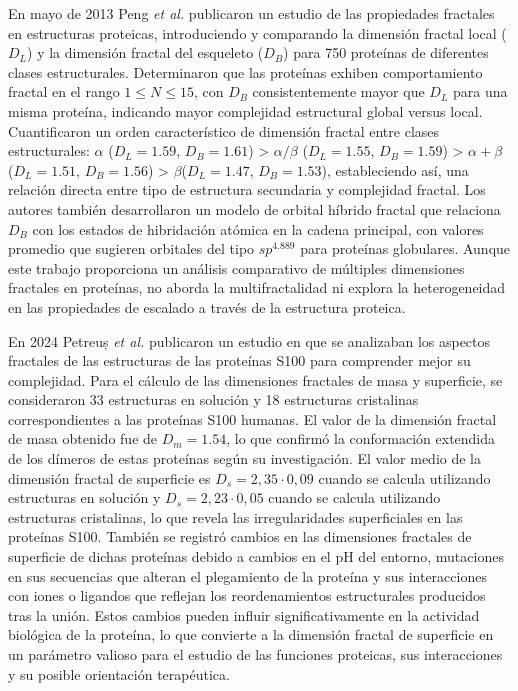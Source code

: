 En mayo de 2013 Peng \textit{et al.}\cite{Peng2013} publicaron un estudio de las propiedades fractales en estructuras proteicas, introduciendo y comparando la dimensión fractal local ($D_L$) y la dimensión fractal del esqueleto ($D_B$) para 750 proteínas de diferentes clases estructurales. Determinaron que las proteínas exhiben comportamiento fractal en el rango $1 \leq N \leq 15$, con $D_B$ consistentemente mayor que $D_L$ para una misma proteína, indicando mayor complejidad estructural global versus local. Cuantificaron un orden característico de dimensión fractal entre clases estructurales: $\alpha$ ($D_L = 1.59$, $D_B = 1.61$) > $\alpha/\beta$ ($D_L = 1.55$, $D_B = 1.59$) > $\alpha+\beta$ ($D_L = 1.51$, $D_B = 1.56$) > $\beta$($D_L = 1.47$, $D_B = 1.53$), estableciendo así, una relación directa entre tipo de estructura secundaria y complejidad fractal. Los autores también desarrollaron un modelo de orbital híbrido fractal que relaciona $D_B$ con los estados de hibridación atómica en la cadena principal, con valores promedio que sugieren orbitales del tipo $sp^{4.889}$ para proteínas globulares. Aunque este trabajo proporciona un análisis comparativo de múltiples dimensiones fractales en proteínas, no aborda la multifractalidad ni explora la heterogeneidad en las propiedades de escalado a través de la estructura proteica. 


En 2024 Petreuș \textit{et al.} \cite{Petreus2024} publicaron un estudio en que se analizaban los aspectos fractales de las estructuras de las prote\'{i}nas S100 para comprender mejor su complejidad. Para el c\'{a}lculo de las dimensiones fractales de masa y superficie, se consideraron 33 estructuras en soluci\'{o}n y 18 estructuras cristalinas correspondientes a las prote\'{i}nas S100 humanas. El valor de la dimensi\'{o}n fractal de masa obtenido fue de $D_m = 1.54$, lo que confirm\'{o} la conformaci\'{o}n extendida de los d\'{i}meros de estas prote\'{i}nas seg\'{u}n su investigaci\'{o}n. El valor medio de la dimensi\'{o}n fractal de superficie es $D_s = 2,35 \cdot 0,09$ cuando se calcula utilizando estructuras en soluci\'{o}n y $D_s = 2,23 \cdot 0,05$ cuando se calcula utilizando estructuras cristalinas, lo que revela las irregularidades superficiales en las prote\'{i}nas S100. También se registró cambios en las dimensiones fractales de superficie de dichas prote\'{i}nas debido a cambios en el pH del entorno, mutaciones en sus secuencias que alteran el plegamiento de la prote\'{i}na y sus interacciones con iones o ligandos que reflejan los reordenamientos estructurales producidos tras la uni\'{o}n. Estos cambios pueden influir significativamente en la actividad biol\'{o}gica de la prote\'{i}na, lo que convierte a la dimensi\'{o}n fractal de superficie en un par\'{a}metro valioso para el estudio de las funciones proteicas, sus interacciones y su posible orientaci\'{o}n terap\'{e}utica.

